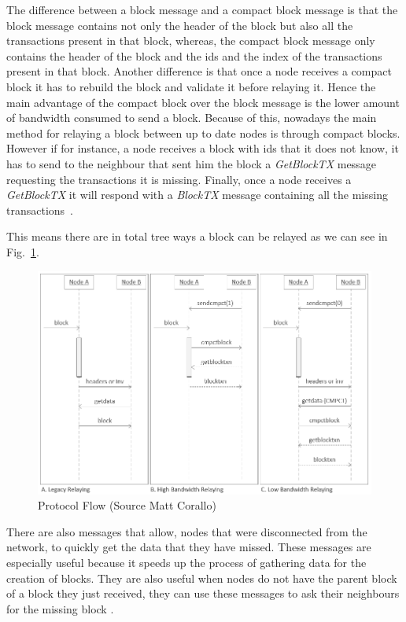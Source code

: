 The difference between a block message and a compact block message is that the block message contains not only the header of the block but also all the transactions present in that block, whereas, the compact block message only contains the header of the block and the ids and the index of the transactions present in that block. Another difference is that once a node receives a compact block it has to rebuild the block and validate it before relaying it. Hence the main advantage of the compact block over the block message is the lower amount of bandwidth consumed to send a block. Because of this, nowadays the main method for relaying a block between up to date nodes is through compact blocks. However if for instance, a node receives a block with ids that it does not know, it has to send to the neighbour that sent him the block a \textit{GetBlockTX} message requesting the transactions it is missing. Finally, once a node receives a \textit{GetBlockTX} it will respond with a  \textit{BlockTX} message containing all the missing transactions~\cite{bip152}.

This means there are in total tree ways a block can be relayed as we can see in Fig.~\ref{fig:protocol-flow}.

\begin{figure}[h]
\centering
\includegraphics[scale=0.4]{figs/bip-152.png}
\caption{Protocol Flow (Source Matt Corallo)}
\label{fig:protocol-flow}
\end{figure}

There are also messages that allow, nodes that were disconnected from the network, to quickly get the data that they have missed. These messages are especially useful because it speeds up the process of gathering data for the creation of blocks. They are also useful when nodes do not have the parent block of a block they just received, they can use these messages to ask their neighbours for the missing block \cite{bitcoincorewiki}.

